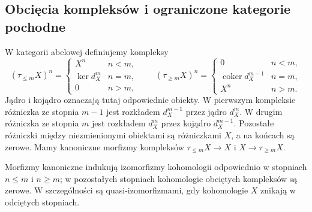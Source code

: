 \subsection{Obcięcia kompleksów i ograniczone kategorie pochodne}
\begin{definicja}\label{cat:def:canonical-truncations}
W kategorii abelowej definiujemy kompleksy
\[
 (\tau_{\le m}X)^n=
 \begin{cases}X^n&n<m,\\ \ker d_X^m&n=m,\\0&n>m,\end{cases}
 \qquad
 (\tau_{\ge m}X)^n=
 \begin{cases}0&n<m,\\ \operatorname{coker}d_X^{m-1}&n=m,\\ X^n&n>m.\end{cases}
\]
Jądro i kojądro oznaczają tutaj odpowiednie obiekty. W pierwszym kompleksie różniczka ze stopnia $m-1$ jest rozkładem $d_X^{m-1}$ przez jądro $d_X^m$. W drugim różniczka ze stopnia $m$ jest rozkładem $d_X^m$ przez kojądro $d_X^{m-1}$. Pozostałe różniczki między niezmienionymi obiektami są różniczkami $X$, a na końcach są zerowe. Mamy kanoniczne morfizmy kompleksów $\tau_{\le m}X\to X$ i $X\to\tau_{\ge m}X$.
\end{definicja}
\begin{stwierdzenie}\label{cat:prop:truncation-cohomology}
Morfizmy kanoniczne indukują izomorfizmy kohomologii odpowiednio w stopniach $n\le m$ i $n\ge m$; w pozostałych stopniach kohomologie obciętych kompleksów są zerowe. W szczególności są quasi-izomorfizmami, gdy kohomologie $X$ znikają w odciętych stopniach.
\end{stwierdzenie}
